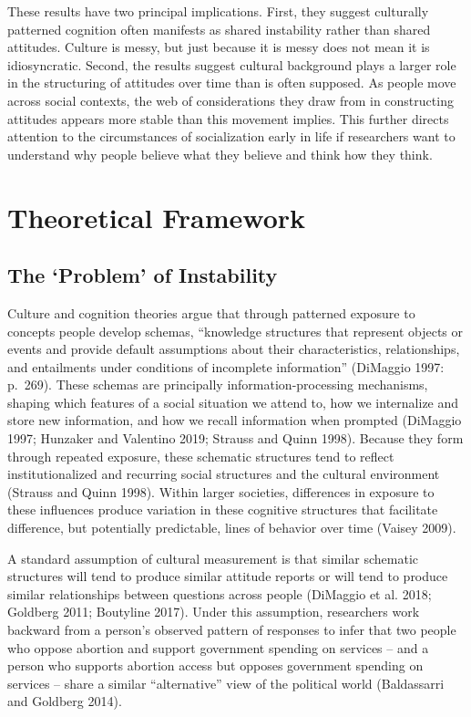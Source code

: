 \documentclass[12pt,]{article}
\begin{document}
These results have two principal implications. First, they suggest culturally patterned cognition often manifests as shared instability rather than shared attitudes. Culture is messy, but just because it is messy does not mean it is idiosyncratic. Second, the results suggest cultural background plays a larger role in the structuring of attitudes over time than is often supposed. As people move across social contexts, the web of considerations they draw from in constructing attitudes appears more stable than this movement implies. This further directs attention to the circumstances of socialization early in life if researchers want to understand why people believe what they believe and think how they think.

\hypertarget{theoretical-framework}{%
\section{Theoretical Framework}\label{theoretical-framework}}

\hypertarget{the-problem-of-instability}{%
\subsection{The `Problem' of Instability}\label{the-problem-of-instability}}

Culture and cognition theories argue that through patterned exposure to concepts people develop schemas, ``knowledge structures that represent objects or events and provide default assumptions about their characteristics, relationships, and entailments under conditions of incomplete information'' (DiMaggio 1997: p.~269). These schemas are principally information-processing mechanisms, shaping which features of a social situation we attend to, how we internalize and store new information, and how we recall information when prompted (DiMaggio 1997; Hunzaker and Valentino 2019; Strauss and Quinn 1998). Because they form through repeated exposure, these schematic structures tend to reflect institutionalized and recurring social structures and the cultural environment (Strauss and Quinn 1998). Within larger societies, differences in exposure to these influences produce variation in these cognitive structures that facilitate difference, but potentially predictable, lines of behavior over time (Vaisey 2009).

A standard assumption of cultural measurement is that similar schematic structures will tend to produce similar attitude reports or will tend to produce similar relationships between questions across people (DiMaggio et al. 2018; Goldberg 2011; Boutyline 2017). Under this assumption, researchers work backward from a person's observed pattern of responses to infer that two people who oppose abortion and support government spending on services -- and a person who supports abortion access but opposes government spending on services -- share a similar ``alternative'' view of the political world (Baldassarri and Goldberg 2014).
\end{document}
